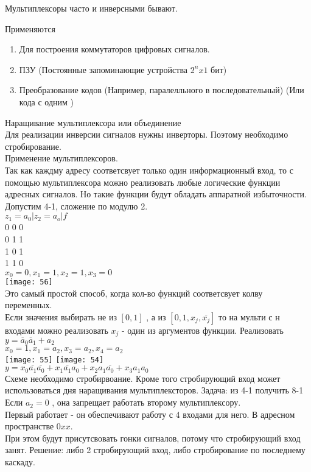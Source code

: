 Мультиплексоры часто и инверсными бывают.

Применяются\\
\begin{enumerate}
  \item Для построения коммутаторов цифровых сигналов.
  \item ПЗУ (Постоянные запоминающие устройства $ 2^n x 1 $ бит)
  \item Преобразование кодов (Например, паралелльного в последовательный) (Или кода с одним )
\end{enumerate}


Наращивание  мультиплексора или объединение\\
Для реализации инверсии сигналов нужны инверторы. Поэтому необходимо стробирование.\\

Применение мультиплексоров.\\
Так как каждму адресу соответсвует только один информационный вход,
то с помощью мультиплексора можно реализовать любые логические функции адресных сигналов.
Но такие функции будут обладать аппаратной избыточности.
Допустим 4-1, сложение по модулю 2.\\
$z_1=a_0 |z_2 =a_o | f$\\
0 0 0\\
0 1 1\\
1 0 1\\
1 1 0\\
$x_0 = 0 , x_1 = 1, x_2 = 1, x_3 = 0$\\
\texttt{[image: 56]}\\
Это самый простой способ, когда кол-во функций соответсвует колву переменных.\\
Если значения выбирать не из $[0,1]$ , а из $[0,1,x_j,  \overline{x_j}]$ то на мульти с н входами можно реализовать
$x_j$ - один из аргументов функции.
Реализовать\\
$y = \overline{a}_0 \overline{a}_1 + a_2$\\
$x_0 = 1, x_1 = a_2, x_3= a_2,x_4= a_2$\\
\texttt{[image: 55]}
\texttt{[image: 54]}\\

$y = x_0 \overline{a_1}\overline{a_0} + x_1 \overline{a_1} a_0 + x_2 a_1 \overline{a_0} + x_3 a_1 a_0$\\

Схеме необходимо стробирвоание. Кроме того стробирующий вход может использоваться дня наращивания мультиплексторов.
Задача: из 4-1 получить 8-1\\

Если $a_2 = 0$ , она запрещает работать второму мультиплексору.\\
Первый работает - он обеспечивают работу с 4 входами для него. В адресном пространстве $0xx$. \\
При этом будут присутсвовать гонки сигналов, потому что стробирующий вход занят.
Решение: либо 2 стробирующий вход, либо стробирование по последнему каскаду.
